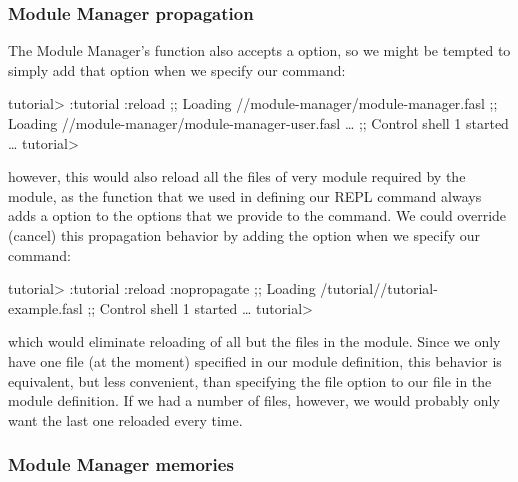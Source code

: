 \documentclass[10pt,twoside,english,pdftex]{article}
\begin{document}
\subsubsection*{Module Manager propagation}

The Module Manager's  function also accepts a
 option, so we might be tempted to simply add that option when
we specify our  command:
%
\W\supp
\begin{example}
\textcolor{darkergray}{%
  tutorial> :tutorial :reload
  ;;   Loading //module-manager/module-manager.fasl
  ;;     Loading
  //module-manager/module-manager-user.fasl
     \textrm{\ldots{}}
  ;; Control shell 1 started
     \textrm{\ldots{}}
  tutorial>}
\end{example}
%
however, this would also reload all the files of very module required by the
 module, as the  function that
we used in defining our  REPL command always adds a
 option to the options that we provide to the command.
We could override (cancel) this propagation behavior by adding the
 option when we specify our 
command:
%
\W\supp\notpretop
\begin{smallexample}
\textcolor{darkergray}{%
  tutorial> :tutorial :reload :nopropagate
  ;; Loading /tutorial//tutorial-example.fasl
  ;; Control shell 1 started
     \textrm{\ldots{}}
  tutorial>}
\end{smallexample}
%
which would eliminate reloading of all but the files in the 
module.  Since we only have one file (at the moment) specified in our
 module definition, this behavior is equivalent, but less
convenient, than specifying the  file option to our
 file in the module definition.  If we had a
number of files, however, we would probably only want the last one reloaded
every time.

\subsubsection*{Module Manager memories}
\end{document}
